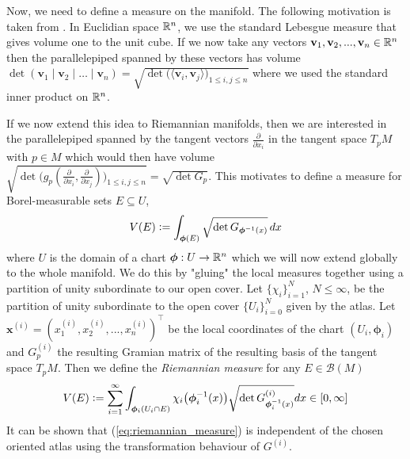 \documentclass[../master_thesis.tex]{subfiles}
\begin{document}
Now, we need to define a measure on the manifold. 
The following motivation is taken from \cite[3.H.2]{gallot_hulin_lafontaine}.
In Euclidian space $\mathbb{R}^n$, we use the standard Lebesgue measure that gives 
volume one to the unit cube. If we now take any vectors $\mathbf{v}_1, \mathbf{v}_2, ..., \mathbf{v}_n 
\in \mathbb{R}^n$ then the parallelepiped spanned by these vectors has 
volume $\det (\mathbf{v}_1 \mid \mathbf{v}_2 \mid \dots \mid \mathbf{v}_n) 
= \sqrt{ \det \big( \langle \mathbf{v}_i , \mathbf{v}_j \rangle \big)_{1\leq i,j \leq n} }$ where 
we used the standard inner product on $\mathbb{R}^n$. 

If we now extend this idea to Riemannian manifolds, then we are interested 
in the parallelepiped spanned by the tangent vectors $\frac{\partial}{\partial x_i}$
in the tangent space $T_p M$ with $p \in M$
which would then have volume $ \sqrt{\det \big( g_p(\frac{\partial}{\partial x_i}, 
\frac{\partial}{\partial x_j}) \big)_{1\leq i,j \leq n} } = 
\sqrt{ \det G_p }$. This motivates to define a measure for Borel-measurable sets 
$E \subseteq U$, 
\begin{align*}
    V(E) \vcentcolon= \int_{\boldsymbol{\phi}(E)} \sqrt{ \det G_{\boldsymbol{\phi}^{-1}(x)}} \,dx 
\end{align*} 
where $U$ is 
the domain of a chart $\boldsymbol{\phi}: U \rightarrow \mathbb{R}^n$ 
which we will now extend globally to the whole manifold. We do this 
by "gluing" the local measures together using a partition of unity subordinate 
to our open cover. 
Let $\{ \chi_i \}_{i=1}^N$, $N \leq \infty$, be the partition of unity 
subordinate to the open cover $\{U_i\}_{i = 0}^N$ given by the atlas. 
Let $\mathbf{x}^{(i)} = (x_1^{(i)}, x_2^{(i)}, ..., x_n^{(i)})^\top$ be the local 
coordinates of the chart $(U_i,\bm{\phi}_i)$ and 
$G_p^{(i)}$ the resulting Gramian matrix of the resulting basis of the tangent space
$T_p M$.
Then we define the 
\textit{Riemannian measure} for any $E \in \mathcal{B}(M)$
\begin{align}
    V(E) \vcentcolon= \sum\limits_{i=1}^\infty \int_{\boldsymbol{\phi}_i(U_i \cap E)}
        \chi_i\big(\boldsymbol{\phi}_i^{-1}(x)\big) \sqrt{\det G^{(i)}_{\boldsymbol{\phi}_i^{-1}(x)}} dx 
        \in [0,\infty] \label{eq:riemannian_measure}
\end{align}
It can be shown that (\ref{eq:riemannian_measure}) is independent of the chosen oriented atlas 
using the transformation behaviour of $G^{(i)}$. 
\end{document}
